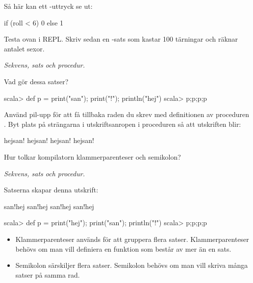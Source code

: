 \Subtask Så här kan ett -uttryck se ut:
\begin{Code}
if (roll < 6) 0 else 1 
\end{Code}
Testa ovan i REPL. Skriv sedan en -sats som kastar 100 tärningar och räknar antalet sexor. 

\SOLUTION

\TaskSolved \what

\SubtaskSolved \TODO

\QUESTEND



\def\what{\emph{Sekvens, sats och procedur.}}

\QUESTBEGIN

\Task \what

\Subtask Vad gör dessa satser? 
\begin{REPLnonum}
scala> def p = { print("san"); print("!"); println("hej")}
scala> p;p;p;p
\end{REPLnonum}

\Subtask
Använd pil-upp för att få tillbaka raden du skrev med definitionen av proceduren . Byt plats på strängarna i utskriftsanropen i proceduren  så att utskriften blir: 
\begin{REPLnonum}
hejsan!
hejsan!
hejsan!
hejsan!
\end{REPLnonum}

\Subtask Hur tolkar kompilatorn klammerparenteser och semikolon?

\SOLUTION

\TaskSolved \what

\SubtaskSolved 
Satserna skapar denna utskrift:
\begin{REPLnonum}
san!hej
san!hej
san!hej
san!hej
\end{REPLnonum}

\SubtaskSolved 
\begin{REPLnonum}
scala> def p = { print("hej"); print("san"); println("!")}
scala> p;p;p;p
\end{REPLnonum}

\SubtaskSolved 
\begin{itemize}
\item Klammerparenteser används för att gruppera flera satser. Klammerparenteser behövs om man vill definiera en funktion som består av mer än en sats.  

\item Semikolon särskiljer flera satser. Semikolon behövs om man vill skriva många satser på samma rad.


\end{itemize}

